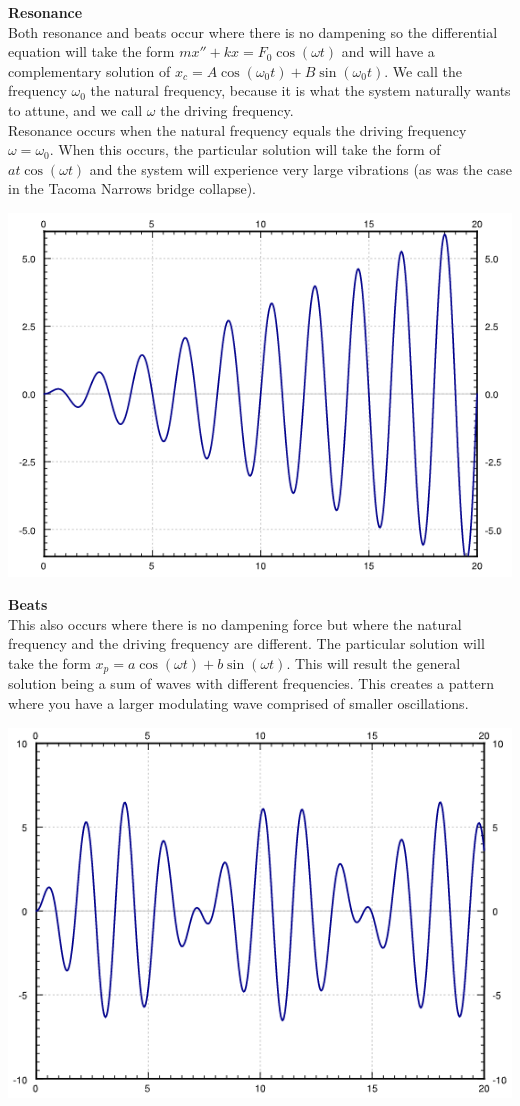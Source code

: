\textbf{Resonance}\\
Both resonance and beats occur where there is no dampening so the differential equation will take the form $mx''+kx=F_0\cos(\omega t)$ and will have a complementary solution of $x_c=A\cos(\omega_0 t)+B\sin(\omega_0 t)$. We call the frequency $\omega_0$ the natural frequency, because it is what the system naturally wants to attune, and we call $\omega$ the driving frequency.\\ Resonance occurs when the natural frequency equals the driving frequency $\omega=\omega_0$. When this occurs, the particular solution will take the form of $at\cos(\omega t)$ and the system will experience very large vibrations (as was the case in the Tacoma Narrows bridge collapse).\\
\centerline{\includegraphics[scale=0.8]{Images/ODEPictures/resonance.png}}

\textbf{Beats}\\
This also occurs where there is no dampening force but where the natural frequency and the driving frequency are different. The particular solution will take the form $x_p=a\cos(\omega t)+b\sin(\omega t)$. This will result the general solution being a sum of waves with different frequencies. This creates a pattern where you have a larger modulating wave comprised of smaller oscillations.\\
\centerline{\includegraphics[scale=0.8]{Images/ODEPictures/Beats.png}}

